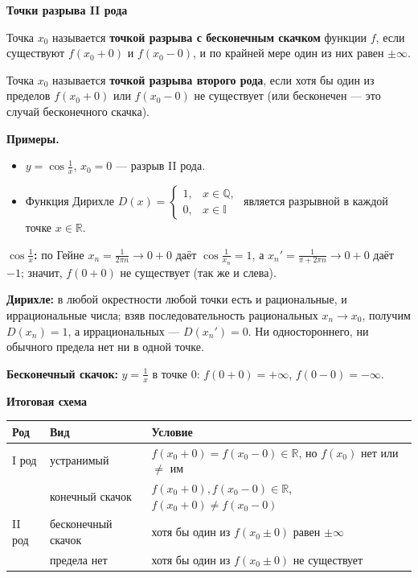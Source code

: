 \documentclass[a4paper,11pt]{article}
\newcommand{\R}{\mathbb{R}}
\newcommand{\podr}[1]{\par\needspace{8\baselineskip}\medskip
  {\large\bfseries\textcolor{oprc!80!black}{#1}}\par\nopagebreak\smallskip}
\begin{document}
\podr{Точки разрыва II рода}

\begin{opr}
Точка $x_0$ называется \textbf{точкой разрыва с бесконечным скачком} функции $f$, если существуют $f(x_0 + 0)$ и $f(x_0 - 0)$,
и по крайней мере один из них равен $\pm\infty$.
\end{opr}

\begin{opr}
Точка $x_0$ называется \textbf{точкой разрыва второго рода}, если хотя бы один из пределов $f(x_0 + 0)$ или $f(x_0 - 0)$
не существует (или бесконечен --- это случай бесконечного скачка).
\end{opr}

\textbf{Примеры.}
\begin{itemize}[leftmargin=*]
  \item $y = \cos\frac1x$, $x_0 = 0$ --- разрыв II рода.
  \item Функция Дирихле $D(x) = \begin{cases} 1, & x \in \mathbb{Q},\\ 0, & x \in \mathbb{I} \end{cases}$
        является разрывной в каждой точке $x \in \R$.
\end{itemize}

\begin{dop}
\textbf{$\cos\frac1x$:} по Гейне $x_n = \frac{1}{2\pi n} \to 0 + 0$ даёт $\cos\frac1{x_n} = 1$, а $x_n' = \frac{1}{\pi + 2\pi n} \to 0 + 0$
даёт $-1$; значит, $f(0 + 0)$ не существует (так же и слева).

\textbf{Дирихле:} в любой окрестности любой точки есть и рациональные, и иррациональные числа; взяв последовательность рациональных
$x_n \to x_0$, получим $D(x_n) = 1$, а иррациональных --- $D(x_n') = 0$. Ни одностороннего, ни обычного предела нет ни в одной точке.

\textbf{Бесконечный скачок:} $y = \frac1x$ в точке $0$: $f(0 + 0) = +\infty$, $f(0 - 0) = -\infty$.
\end{dop}

\podr{Итоговая схема}

\begin{center}
\renewcommand{\arraystretch}{1.35}
\small
\begin{tabular}{|l|l|l|}
\hline
\textbf{Род} & \textbf{Вид} & \textbf{Условие} \\ \hline
I род & устранимый & $f(x_0 + 0) = f(x_0 - 0) \in \R$, но $f(x_0)$ нет или $\ne$ им \\
      & конечный скачок & $f(x_0 + 0), f(x_0 - 0) \in \R$, $f(x_0 + 0) \ne f(x_0 - 0)$ \\ \hline
II род & бесконечный скачок & хотя бы один из $f(x_0 \pm 0)$ равен $\pm\infty$ \\
       & предела нет & хотя бы один из $f(x_0 \pm 0)$ не существует \\ \hline
\end{tabular}
\end{center}
\end{document}
